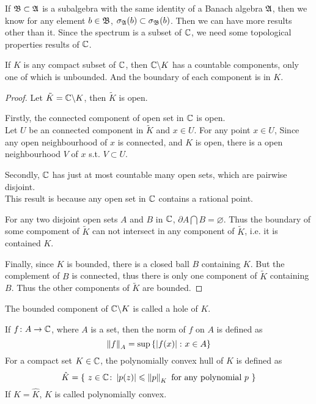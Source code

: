 If $\mathfrak{B} \subset \mathfrak{A}$ is a subalgebra with the same identity of a Banach algebra $\mathfrak{A}$, then we know for any element $b \in \mathfrak{B}$, $\sigma_{\mathfrak{A}}(b) \subset \sigma_{\mathfrak{B}}(b)$. Then we can have more results other than it. Since the spectrum is a subset of $\mathbb{C}$, we need some topological properties results of $\mathbb{C}$.

\begin{lem}
	If $K$ is any compact subset of $\mathbb{C}$, then $\mathbb{C} \backslash K$ has a countable components, only one of which is unbounded. And the boundary of each component is in $K$.
\end{lem}
\begin{proof}
	Let $\tilde{K} = \mathbb{C} \backslash K$, then $\tilde{K}$ is open.
	\item Firstly, the connected component of open set in $\mathbb{C}$ is open. \\
		  Let $U$ be an connected component in $\tilde{K}$ and $x \in U$. For any point $x \in U$, Since any open neighbourhood of $x$ is connected, and $K$ is open, there is a open neighbourhood $V$ of $x$ s.t. $V \subset U$.
	\item Secondly, $\mathbb{C}$ has just at most countable many open sets, which are pairwise disjoint.\\
		  This result is because any open set in $\mathbb{C}$ contains a rational point.
	\item For any two disjoint open sets $A$ and $B$ in $\mathbb{C}$, $\partial A \bigcap B = \varnothing$. Thus the boundary of some compoment of $\tilde{K}$ can not intersect in any component of $\tilde{K}$, i.e. it is contained $K$.
	\item Finally, since $K$ is bounded, there is a closed ball $B$ containing $K$. But the complement of $B$ is connected, thus there is only one component of $\tilde{K}$ containing $B$. Thus the other components of $\tilde{K}$ are bounded.
\end{proof}
\begin{rem}
	The bounded component of $\mathbb{C} \backslash K$ is called a hole of $K$.
\end{rem}

\begin{defn}
	If $f \colon A \rightarrow \mathbb{C}$, where $A$ is a set, then the norm of $f$ on $A$ is defined as
	\begin{equation*}
		\left\lVert f\right\lVert_A = \sup{\{\left\lvert f(x)\right\lvert \colon x \in A\}}
	\end{equation*}
	For a compact set $K \in \mathbb{C}$, the polynomially convex hull of $K$ is defined as
	\begin{equation*}
		\hat{K} = \{~z \in \mathbb{C} \colon \left\lvert p(z)\right\lvert \leqslant \left\lVert p\right\lVert_K \text{ for any polynomial } p ~\}
	\end{equation*}
	If $K = \hat{K}$, $K$ is called polynomially convex.
\end{defn}

